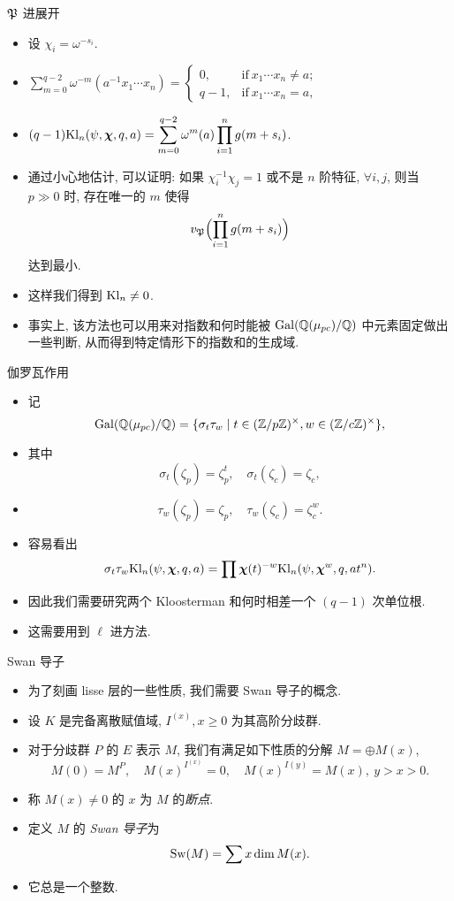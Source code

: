 \documentclass[aspectratio=169,handout]{ctexbeamer}
\newcommand\bchi{{\boldsymbol\chi}}
\begin{document}
\begin{frame}{${\mathfrak{P}}$ 进展开}
	\begin{itemize}
		\item 设 $\chi_i=\omega^{-s_i}$.
		\item $\displaystyle
				\sum_{m=0}^{q-2} \omega^{-m}(a^{-1}x_1\cdots x_n)
				=\begin{cases}
					0,&\text{if}\ x_1\cdots x_n\neq a;\\
					q-1,&\text{if}\ x_1\cdots x_n= a,
				\end{cases}$
		\item $\displaystyle
				(q-1)\Kl_n(\psi,\bchi,q,a)
				=\sum_{m=0}^{q-2}\omega^m(a)\prod_{i=1}^n g(m+s_i)$.
		\item 通过小心地估计, 可以证明: 如果 $\chi_i^{-1}\chi_j=1$ 或不是 $n$ 阶特征, $\forall i,j$, 则当 $p\gg0$ 时, 存在唯一的 $m$ 使得 
		\[
			v_{\mathfrak{P}}\Bigl(\prod_{i=1}^n g(m+s_i)\Bigr)
		\]
		达到最小.
		\item 这样我们得到 ${\mathrm{Kl}}_n\neq 0$.
		\item 事实上, 该方法也可以用来对指数和何时能被 ${\mathrm{Gal}}({\mathbb{Q}}(\mu_{pc})/{\mathbb{Q}})$ 中元素固定做出一些判断, 从而得到特定情形下的指数和的生成域.
	\end{itemize}
\end{frame}


\begin{frame}{伽罗瓦作用}
	\begin{itemize}
		\item 记
		\[
			{\mathrm{Gal}}({\mathbb{Q}}(\mu_{pc})/{\mathbb{Q}})
			=\{\sigma_t\tau_w\mid t\in ({\mathbb{Z}}/p{\mathbb{Z}})^\times,w\in({\mathbb{Z}}/c{\mathbb{Z}})^\times\},
		\]
		\item 其中
		\[
			\sigma_t(\zeta_p)=\zeta_p^t,\quad
			\sigma_t(\zeta_c)=\zeta_c,
		\]
		\item 
		\[
			\tau_w(\zeta_p)=\zeta_p,\quad
			\tau_w(\zeta_c)=\zeta_c^w.
		\]
		\item 容易看出
		\[
			\sigma_t\tau_w\Kl_n(\psi,\bchi,q,a)
			=\prod\bchi(t)^{-w}\Kl_n(\psi,\bchi^w,q,at^n).
		\]
		\item 因此我们需要研究两个 Kloosterman 和何时相差一个 $(q-1)$ 次单位根.
		\item 这需要用到 $\ell$ 进方法.
	\end{itemize}
\end{frame}


\begin{frame}{Swan 导子}
	\begin{itemize}
		\item 为了刻画 lisse 层的一些性质, 我们需要 Swan 导子的概念.
		\item 设 $K$ 是完备离散赋值域, $I^{(x)},x\ge 0$ 为其高阶分歧群. 
		\item 对于分歧群 $P$ 的 $E$ 表示 $M$, 我们有满足如下性质的分解 $M=\oplus M(x)$, 
		\[
			M(0)=M^P,\quad
			M(x)^{I^{(x)}}=0,\quad
			M(x)^{I(y)}=M(x), \ y>x>0.
		\]
		\item 称 $M(x)\neq 0$ 的 $x$ 为 $M$ 的\emph{断点}.
		\item 定义 $M$ 的 \emph{Swan 导子}为
		\[
			{\mathrm{Sw}}(M)=\sum x\dim M(x).
		\]
		\item 它总是一个整数.
	\end{itemize}
\end{frame}
\end{document}
